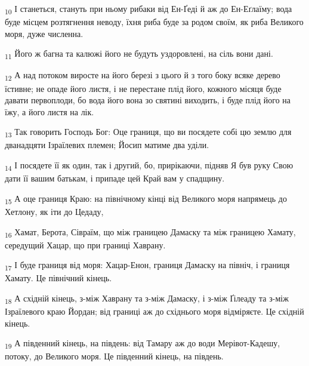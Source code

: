 \begin{tcolorbox}
\textsubscript{10} І станеться, стануть при ньому рибаки від Ен-Ґеді й аж до Ен-Еґлаїму; вода буде місцем розтягнення неводу, їхня риба буде за родом своїм, як риба Великого моря, дуже численна.
\end{tcolorbox}
\begin{tcolorbox}
\textsubscript{11} Його ж багна та калюжі його не будуть уздоровлені, на сіль вони дані.
\end{tcolorbox}
\begin{tcolorbox}
\textsubscript{12} А над потоком виросте на його березі з цього й з того боку всяке дерево їстивне; не опаде його листя, і не перестане плід його, кожного місяця буде давати первоплоди, бо вода його вона зо святині виходить, і буде плід його на їжу, а його листя на лік.
\end{tcolorbox}
\begin{tcolorbox}
\textsubscript{13} Так говорить Господь Бог: Оце границя, що ви посядете собі цю землю для дванадцяти Ізраїлевих племен; Йосип матиме два уділи.
\end{tcolorbox}
\begin{tcolorbox}
\textsubscript{14} І посядете її як один, так і другий, бо, прирікаючи, підняв Я був руку Свою дати її вашим батькам, і припаде цей Край вам у спадщину.
\end{tcolorbox}
\begin{tcolorbox}
\textsubscript{15} А оце границя Краю: на північному кінці від Великого моря напрямець до Хетлону, як іти до Цедаду,
\end{tcolorbox}
\begin{tcolorbox}
\textsubscript{16} Хамат, Берота, Сівраїм, що між границею Дамаску та між границею Хамату, середущий Хацар, що при границі Хаврану.
\end{tcolorbox}
\begin{tcolorbox}
\textsubscript{17} І буде границя від моря: Хацар-Енон, границя Дамаску на північ, і границя Хамату. Це північний кінець.
\end{tcolorbox}
\begin{tcolorbox}
\textsubscript{18} А східній кінець, з-між Хаврану та з-між Дамаску, і з-між Ґілеаду та з-між Ізраїлевого краю Йордан; від границі аж до східнього моря відміряєте. Це східній кінець.
\end{tcolorbox}
\begin{tcolorbox}
\textsubscript{19} А південний кінець, на південь: від Тамару аж до води Мерівот-Кадешу, потоку, до Великого моря. Це південний кінець, на південь.
\end{tcolorbox}

